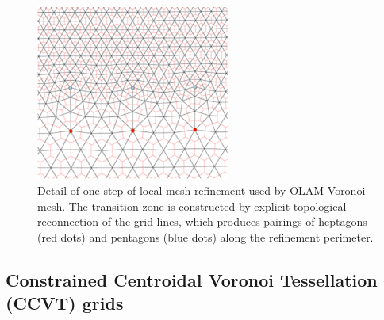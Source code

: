 \documentclass[gmd, manuscript]{copernicus}
\begin{document}
\begin{figure}
\begin{center}
\includegraphics[width=2.5in]{OLAM_Grid_Refinement.png}
\end{center}
\caption{Detail of one step of local mesh refinement used by OLAM Voronoi mesh. The transition zone is constructed by explicit topological reconnection of the grid lines, which produces pairings of heptagons (red dots) and pentagons (blue dots) along the refinement perimeter.} \label{fig:OLAMRefinement}
\end{figure}

\subsection{Constrained Centroidal Voronoi Tessellation (CCVT) grids} \label{sec:grid_ccvt}
\end{document}
